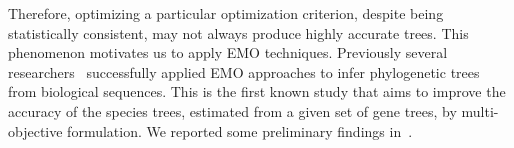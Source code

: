Therefore, optimizing a particular optimization criterion, despite being statistically consistent, may not always produce highly accurate trees. This phenomenon motivates us to apply EMO techniques. 
Previously several researchers~\cite{villalobos2018memetic, santander2016performance, zambrano2016mo} successfully applied EMO approaches to infer phylogenetic trees from biological sequences. This is the first known study that aims to improve the accuracy of the species trees, estimated from a given set of gene trees, by multi-objective formulation. We reported some preliminary findings in~\cite{nayeem2020multi}.

